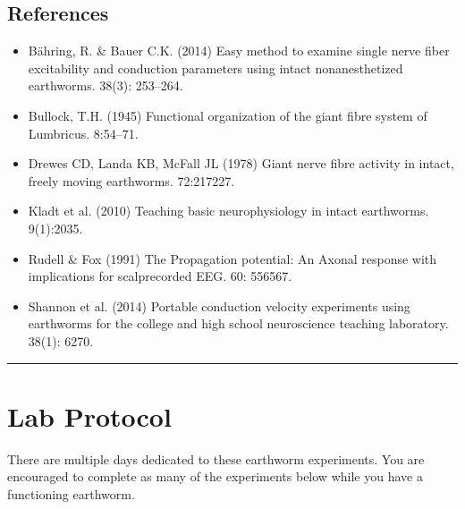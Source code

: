 \documentclass[letterpaper,10pt,english]{jupyterBook}
\begin{document}
\subsection{References}
\label{\detokenize{Earthworm:references}}\begin{itemize}
\item {} 
\sphinxAtStartPar
Bähring, R. \& Bauer C.K. (2014) Easy method to examine single nerve fiber excitability and conduction parameters using intact nonanesthetized earthworms.  38(3): 253–264.

\item {} 
\sphinxAtStartPar
Bullock, T.H. (1945) Functional organization of the giant fibre system of Lumbricus.  8:54–71.

\item {} 
\sphinxAtStartPar
Drewes CD, Landa KB, McFall JL (1978) Giant nerve fibre activity in intact, freely moving earthworms.  72:217\sphinxhyphen{}227.

\item {} 
\sphinxAtStartPar
Kladt et al. (2010) Teaching basic neurophysiology in intact earthworms.  9(1):20\sphinxhyphen{}35.

\item {} 
\sphinxAtStartPar
Rudell \& Fox (1991) The Propagation potential: An Axonal response with implications for scalp\sphinxhyphen{}recorded EEG.  60: 556\sphinxhyphen{}567.

\item {} 
\sphinxAtStartPar
Shannon et al. (2014) Portable conduction velocity experiments using earthworms for the college and high school neuroscience teaching laboratory.  38(1): 62\sphinxhyphen{}70.

\end{itemize}


\bigskip\hrule\bigskip



\section{Lab Protocol}
\label{\detokenize{Earthworm:lab-protocol}}
\sphinxAtStartPar
There are multiple days dedicated to these earthworm experiments. You are encouraged to complete as many of the experiments below while you have a functioning earthworm.
\end{document}
